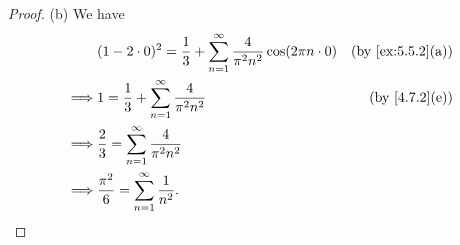 \begin{proof}{(b)}
  We have
  \begin{align*}
             & (1 - 2 \cdot 0)^2 = \frac{1}{3} + \sum_{n = 1}^\infty \frac{4}{\pi^2 n^2} \cos(2 \pi n \cdot 0) & \text{(by \cref{ex:5.5.2}(a))} \\
    \implies & 1 = \frac{1}{3} + \sum_{n = 1}^\infty \frac{4}{\pi^2 n^2}                                       & \text{(by \cref{4.7.2}(e))}    \\
    \implies & \frac{2}{3} = \sum_{n = 1}^\infty \frac{4}{\pi^2 n^2}                                                                            \\
    \implies & \frac{\pi^2}{6} = \sum_{n = 1}^\infty \frac{1}{n^2}.
  \end{align*}
\end{proof}

